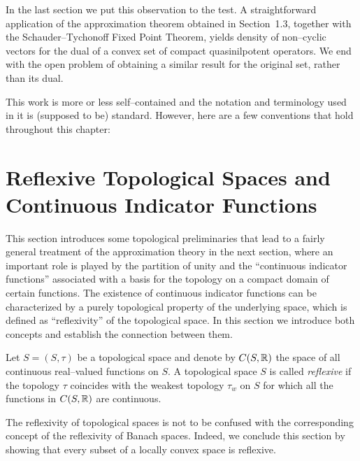\smallskip

In the last section we put this observation to the test. A
straightforward application of the approximation theorem
obtained in Section~1.3, together with the Schauder--Tychonoff
Fixed Point Theorem, yields density of non--cyclic vectors for
the dual of a convex set of compact quasinilpotent operators.
We end with the open problem of obtaining a similar result for
the original set, rather than its dual.

\bigskip

This work is more or less self--contained and the notation and
terminology used in it is (supposed to be) standard. However,
here are a few conventions that hold throughout this chapter:


\bigskip

\goodbreak

\def\baselinestretch{1.1}

\section{Reflexive Topological Spaces and Continuous Indicator Functions}

This section introduces some topological preliminaries that
lead to a fairly general treatment of the approximation theory
in the next section, where an important role is played by the
partition of unity and the ``continuous indicator functions''
associated with a basis for the topology on a compact domain of
certain functions. The existence of continuous indicator
functions can be characterized by a purely topological property
of the underlying space, which is defined as ``reflexivity'' of
the topological space. In this section we introduce both
concepts and establish the connection between them.

\def\baselinestretch{1.66}

\begin{defn}
Let $S=(S,\tau)$ be a topological space and denote by
$C(S,\mathbb R)$ the space of all continuous real--valued functions
on $S$. A topological space $S$ is called {\em reflexive} if
the topology $\tau$ coincides with the weakest topology
$\tau_w$ on $S$ for which all the functions in $C(S,\mathbb R)$ are
continuous.
\end{defn}

\begin{rem}
The reflexivity of topological spaces is not to be confused
with the corresponding concept of the reflexivity of Banach
spaces. Indeed, we conclude this section by showing that every
subset of a locally convex space is reflexive.
\end{rem}

